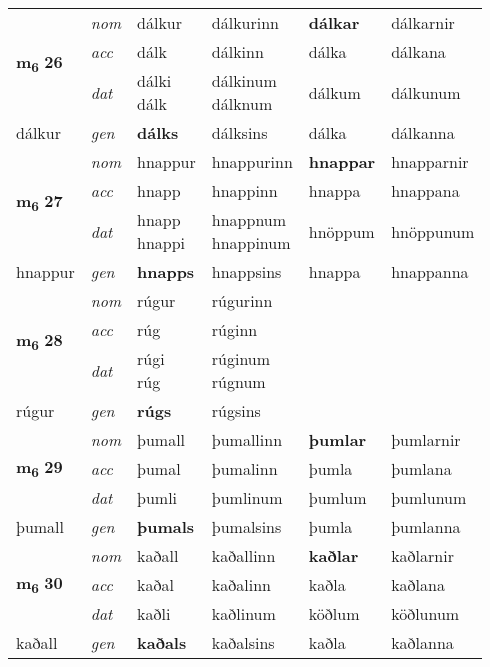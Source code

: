 \begin{longtable}[l]{X>{\footnotesize\itshape}XXXXX}
\multirow{3}{*}{{{\textbf{m{\textsubscript{6}}} \Large{\textbf{26}}}}}  
 & nom & dálkur & dálkurinn    & \textbf{dálkar} & dálkarnir  \\*
 & acc & dálk  & dálkinn   & dálka  & dálkana \\*
 & dat & \specialcell{dálki\\ dálk} & \specialcell{dálkinum\\ dálknum}   & dálkum & dálkunum \\*
 {\footnotesize{dálkur}} &  gen & \textbf{dálks}  & dálksins  & dálka & dálkanna \\
\cmidrule{1-6}


\multirow{3}{*}{{{\textbf{m{\textsubscript{6}}} \Large{\textbf{27}}}}}  
 & nom & hnappur & hnappurinn    & \textbf{hnappar} & hnapparnir  \\*
 & acc & hnapp  & hnappinn   & hnappa  & hnappana \\*
 & dat & \specialcell{hnapp\\ hnappi} & \specialcell{hnappnum\\ hnappinum}   & hnöppum & hnöppunum \\*
 {\footnotesize{hnappur}} &  gen & \textbf{hnapps}  & hnappsins  & hnappa & hnappanna \\
\cmidrule{1-6}


\multirow{3}{*}{{{\textbf{m{\textsubscript{6}}} \Large{\textbf{28}}}}}  
 & nom & rúgur & rúgurinn    & \textbf{} &   \\*
 & acc & rúg  & rúginn   &   &  \\*
 & dat & \specialcell{rúgi\\ rúg} & \specialcell{rúginum\\ rúgnum}   &  &  \\*
 {\footnotesize{rúgur}} &  gen & \textbf{rúgs}  & rúgsins  &  &  \\
\cmidrule{1-6}


\multirow{3}{*}{{{\textbf{m{\textsubscript{6}}} \Large{\textbf{29}}}}}  
 & nom & þumall & þumallinn    & \textbf{þumlar} & þumlarnir  \\*
 & acc & þumal  & þumalinn   & þumla  & þumlana \\*
 & dat & þumli & þumlinum   & þumlum & þumlunum \\*
 {\footnotesize{þumall}} &  gen & \textbf{þumals}  & þumalsins  & þumla & þumlanna \\
\cmidrule{1-6}


\multirow{3}{*}{{{\textbf{m{\textsubscript{6}}} \Large{\textbf{30}}}}}  
 & nom & kaðall & kaðallinn    & \textbf{kaðlar} & kaðlarnir  \\*
 & acc & kaðal  & kaðalinn   & kaðla  & kaðlana \\*
 & dat & kaðli & kaðlinum   & köðlum & köðlunum \\*
 {\footnotesize{kaðall}} &  gen & \textbf{kaðals}  & kaðalsins  & kaðla & kaðlanna \\
\cmidrule{1-6}



\end{longtable}
